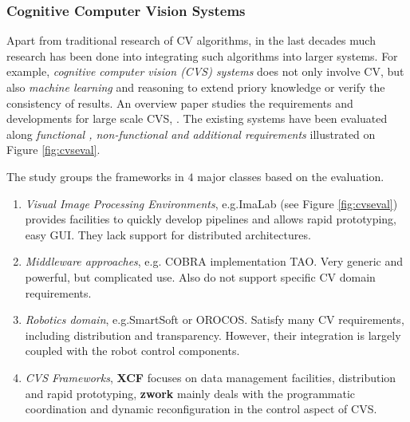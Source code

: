 \subsubsection{Cognitive Computer Vision Systems}
Apart from traditional research of CV algorithms, in the last decades much research has been done into integrating such algorithms into larger systems. For example, {\em cognitive computer vision (CVS) systems} does not only involve CV, but also {\em machine learning} and reasoning to extend priory knowledge or verify the consistency of results. An overview paper studies the requirements and developments for large scale CVS, \cite{WredeBSPV04}. The existing systems have been evaluated along {\em functional , non-functional and additional requirements} illustrated on Figure \ref{fig:cvseval}.

The study groups the frameworks in $4$ major classes based on the evaluation.  

\begin{enumerate}
\item{{\em Visual Image Processing Environments}, e.g.ImaLab (see Figure \ref{fig:cvseval}) provides facilities to quickly develop pipelines and allows rapid prototyping, easy GUI. They lack support for distributed architectures.}
\item{{\em Middleware approaches}, e.g. COBRA implementation TAO. Very generic and powerful, but complicated use. Also do not support specific CV domain requirements.}
\item{{\em Robotics domain}, e.g.SmartSoft or OROCOS. Satisfy many CV requirements, including distribution and transparency. However, their integration is largely coupled with the robot control components.}
\item{{\em CVS Frameworks}, {\bf XCF} \cite{Wrede2004-AXB} focuses on data management
facilities, distribution and rapid prototyping, {\bf zwork} \cite{ponweiser2003reusable} mainly deals with the programmatic coordination and
dynamic reconfiguration in the control aspect of CVS.}
\end{enumerate}

